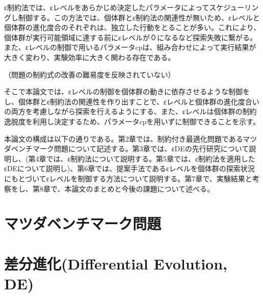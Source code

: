 \documentclass[12pt,a4paper]{jreport}
\begin{document}
ε制約法では、εレベルをあらかじめ決定したパラメータによってスケジューリングし制御する。この方法では、個体群とε制約法の関連性が無いため、εレベルと個体群の進化度合のそれぞれは、独立した行動をとることが多い。これにより、個体群が実行可能領域に達する前にεレベルが０になるなど探索失敗に繋がる。また、εレベルの制御で用いるパラメータcpは、組み合わせによって実行結果が大きく変わり、実験効率に大きく関わる存在である。

（問題の制約式の改善の難易度を反映されていない）

そこで本論文では、εレベルの制御を個体群の動きに依存させるような制御をし、個体群とε制約法の関連性を作り出すことで、εレベルと個体群の進化度合いの両方を考慮しながら探索を行えるようにする、また、εレベルは個体群の制約逸脱度を利用し決定するため、パラメータcpを用いずに制御できることを示す。


本論文の構成は以下の通りである。第2章では、制約付き最適化問題であるマツダベンチマーク問題について記述する。第3章では、εDEの先行研究について説明し、(第4章では、ε制約法について説明する。第5章では、ε制約法を適用したεDEについて説明し)、第6章では、提案手法であるεレベルを個体群の探索状況にもとづいてεレベルを制御する方法について説明する。第7章で、実験結果と考察をし、第8章で、本論文のまとめと今後の課題について述べる。

\section{マツダベンチマーク問題}


\section{差分進化(Differential Evolution, DE)}
\end{document}
